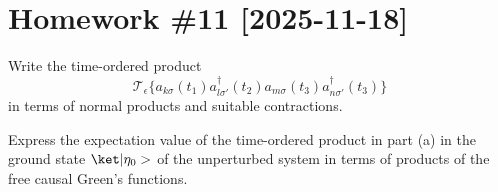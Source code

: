 
\section*{Homework \#11 [2025-11-18]}

\begin{problem}[label = prob.11.1]\leavevmode
  \begin{enumext}
    \item Write the time-ordered product
    \[
      \mathcal T_\epsilon \{a_{k\sigma}(t_1)a_{l\sigma'}^\dagger(t_2)
                            a_{m\sigma}(t_3) a_{n\sigma'}^\dagger(t_3)\}
    \]
    in terms of normal products and suitable contractions.
    \item Express the expectation value of the time-ordered product in part
    (a) in the ground state $\ket|\eta_0>$ of the unperturbed system in terms
    of products of the free causal Green's functions.
  \end{enumext}
\end{problem}
